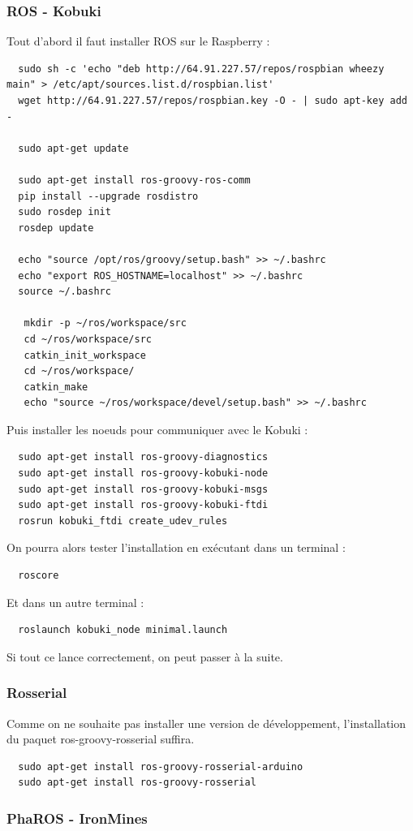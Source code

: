 \documentclass[a4paper, 11pt]{article}
\begin{document}
\subsubsection{ROS - Kobuki}
Tout d'abord il faut installer ROS sur le Raspberry : 
\begin{lstlisting}
  sudo sh -c 'echo "deb http://64.91.227.57/repos/rospbian wheezy main" > /etc/apt/sources.list.d/rospbian.list'
  wget http://64.91.227.57/repos/rospbian.key -O - | sudo apt-key add -

  sudo apt-get update

  sudo apt-get install ros-groovy-ros-comm
  pip install --upgrade rosdistro
  sudo rosdep init
  rosdep update

  echo "source /opt/ros/groovy/setup.bash" >> ~/.bashrc
  echo "export ROS_HOSTNAME=localhost" >> ~/.bashrc
  source ~/.bashrc

   mkdir -p ~/ros/workspace/src
   cd ~/ros/workspace/src
   catkin_init_workspace
   cd ~/ros/workspace/
   catkin_make
   echo "source ~/ros/workspace/devel/setup.bash" >> ~/.bashrc
\end{lstlisting}
Puis installer les noeuds pour communiquer avec le Kobuki : 
\begin{lstlisting}
  sudo apt-get install ros-groovy-diagnostics
  sudo apt-get install ros-groovy-kobuki-node 
  sudo apt-get install ros-groovy-kobuki-msgs
  sudo apt-get install ros-groovy-kobuki-ftdi
  rosrun kobuki_ftdi create_udev_rules
\end{lstlisting}
On pourra alors tester l'installation en exécutant dans un terminal :
\begin{verbatim}
  roscore
\end{verbatim}
Et dans un autre terminal : 
\begin{verbatim}
  roslaunch kobuki_node minimal.launch
\end{verbatim}
Si tout ce lance correctement, on peut passer à la suite.
\subsubsection{Rosserial}
Comme on ne souhaite pas installer une version de développement,
l'installation du paquet ros-groovy-rosserial suffira.
\begin{lstlisting}
  sudo apt-get install ros-groovy-rosserial-arduino
  sudo apt-get install ros-groovy-rosserial
\end{lstlisting}

\subsubsection{PhaROS - IronMines}
\end{document}
